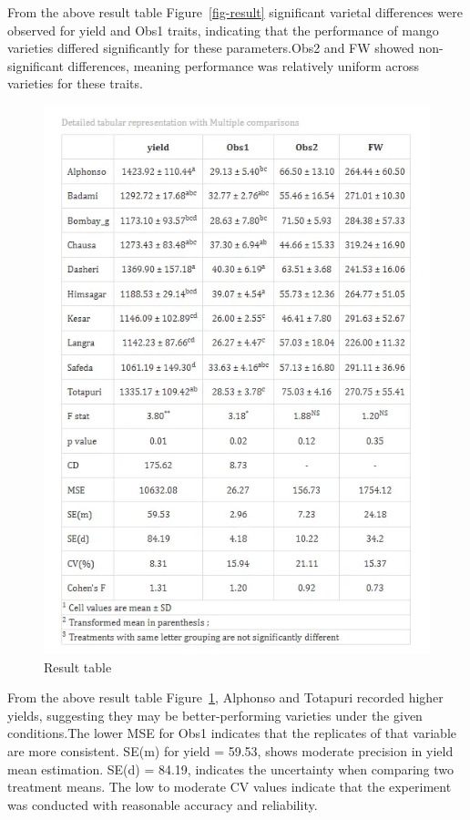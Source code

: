\documentclass[
  letterpaper,
  DIV=11,
  numbers=noendperiod]{scrartcl}
\begin{document}
From the above result table Figure~\ref{fig-result} significant varietal
differences were observed for yield and Obs1 traits, indicating that the
performance of mango varieties differed significantly for these
parameters.Obs2 and FW showed non-significant differences, meaning
performance was relatively uniform across varieties for these traits.

\begin{figure}

{\centering \includegraphics{Result2.webp}

}

\caption{\label{fig-result2}Result table}

\end{figure}

From the above result table Figure~\ref{fig-result2}, Alphonso and
Totapuri recorded higher yields, suggesting they may be
better-performing varieties under the given conditions.The lower MSE for
Obs1 indicates that the replicates of that variable are more consistent.
SE(m) for yield = 59.53, shows moderate precision in yield mean
estimation. SE(d) = 84.19, indicates the uncertainty when comparing two
treatment means. The low to moderate CV values indicate that the
experiment was conducted with reasonable accuracy and reliability.
\end{document}
